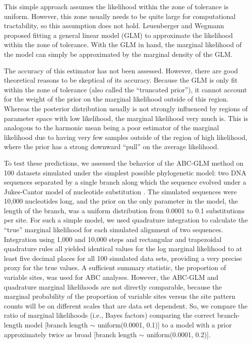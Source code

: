 This simple approach assumes the likelihood within the zone of tolerance is
uniform.
However, this zone usually needs to be quite large for computational
tractability, so this assumption does not hold.
Leuenberger and Wegmann \citep{Leuenberger2010} proposed fitting a general
linear model (GLM) to approximate the likelihood within the zone of tolerance.
With the GLM in hand, the marginal likelihood of the model can simply be
approximated by the marginal density of the GLM.

The accuracy of this estimator has not been assessed.
However, there are good theoretical reasons to be skeptical of its accuracy.
Because the GLM is only fit within the zone of tolerance (also called the
``truncated prior''), it cannot account for the weight of the prior on the
marginal likelihood outside of this region.
Whereas the posterior distribution usually is not strongly influenced by
regions of parameter space with low likelihood, the marginal likelihood very
much is.
This is analogous to the harmonic mean being a poor estimator of the marginal
likelihood due to having very few samples outside of the region of high
likelihood, where the prior has a strong downward ``pull'' on the average
likelihood.

To test these predictions, we assessed the behavior of the ABC-GLM method on
100 datasets simulated under the simplest possible phylogenetic model: two DNA
sequences separated by a single branch along which the sequence evolved under a
Jukes-Cantor model of nucleotide substitution \citep{JC1969}.
The simulated sequences were 10,000 nucleotides long, and the prior on the only
parameter in the model, the length of the branch, was a uniform distribution
from 0.0001 to 0.1 substitutions per site.
For such a simple model, we used quadrature integration to calculate the
``true'' marginal likelihood for each simulated alignment of two sequences.
Integration using 1,000 and 10,000 steps and rectangular and trapezoidal
quadrature rules all yielded identical values for the log marginal likelihood
to at least five decimal places for all 100 simulated data sets, providing a
very precise proxy for the true values.
A sufficient summary statistic, the proportion of variable sites, was used for
ABC analyses.
However, the ABC-GLM and quadrature marginal likelihoods are not directly
comparable, because the marginal probability of the proportion of variable
sites versus the site pattern counts will be on different scales that are data
set dependent.
So, we compare the ratio of marginal likelihoods (i.e., Bayes factors)
comparing the correct branch-length model
[branch length $\sim$ uniform(0.0001, 0.1)]
to a model with a prior approximately twice as broad
[branch length $\sim$ uniform(0.0001, 0.2)].


